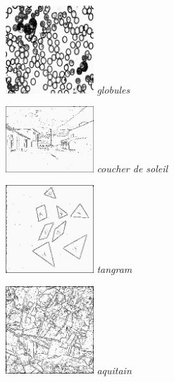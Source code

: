 \documentclass[a4,12pt]{article}
\begin{document}
\begin{minipage}[c]{0.20\linewidth}
	\begin{center}
		\includegraphics[width = 33mm]{./img/p2test_grad_mean_globules.jpg}
		\textit{globules}
	\end{center}
\end{minipage}

\noindent
\begin{minipage}[c]{0.20\linewidth}
	\begin{center}
		\includegraphics[width = 33mm]{./img/p2test_grad_fin_soleil.jpg}
		\textit{coucher de soleil}
	\end{center}
\end{minipage}
\begin{minipage}[c]{0.20\linewidth}
	\begin{center}
		\includegraphics[width = 33mm]{./img/p2test_grad_fin_tangram.jpg}
		\textit{tangram}
	\end{center}
\end{minipage}
\begin{minipage}[c]{0.20\linewidth}
	\begin{center}
		\includegraphics[width = 33mm]{./img/p2test_grad_fin_aqitain.jpg}
		\textit{aquitain}
	\end{center}
\end{minipage}
\end{document}
